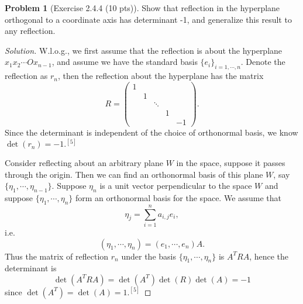 \documentclass{article}
\theoremstyle{definition}
\newtheorem{problem}{Problem}
\theoremstyle{plain}
\begin{document}
\begin{problem}[Exercise 2.4.4 (10 pts)]Show that reflection in the hyperplane orthogonal to a coordinate axis has determinant -1, and generalize this result to any reflection.
\end{problem}
\begin{adjustwidth}{0.7cm}{}
\color{blue}
\begin{proof}[Solution]W.l.o.g., we first assume that the reflection is about the hyperplane $x_1x_2\cdots Ox_{n-1}$, and assume we have the standard basis $\{e_i\}_{i=1,\cdots,n}$. Denote the reflection as $r_n$, then the reflection about the hyperplane has the matrix
\begin{displaymath}
R=\begin{pmatrix}
1&&&&\\
&1&&&\\
&&\ddots&&\\
&&&1&\\
&&&&-1
\end{pmatrix}.
\end{displaymath}
Since the determinant is independent of the choice of orthonormal basis, we know $\det(r_n)=-1.^{[5]}$\par
Consider reflecting about an arbitrary plane $W$ in the space, suppose it passes through the origin. Then we can find an orthonormal basis of this plane $W$, say $\{\eta_1,\cdots,\eta_{n-1}\}$. Suppose $\eta_n$ is a unit vector perpendicular to the space $W$ and suppose $\{\eta_1,\cdots,\eta_n\}$ form an orthonormal basis for the space. We assume that
\begin{displaymath}
\eta_j=\sum_{i=1}^{n}a_{i,j}e_i,
\end{displaymath}
i.e.
\begin{displaymath}
(\eta_1,\cdots,\eta_n)=(e_1,\cdots,e_n)A.
\end{displaymath}
Thus the matrix of reflection $r_n$ under the basis $\{\eta_1,\cdots,\eta_n\}$ is $A^TRA$, hence the determinant is
\begin{displaymath}
\det(A^TRA)=\det(A^T)\det(R)\det(A)=-1
\end{displaymath}
since $\det(A^T)=\det(A)=1.^{[5]}$
\color{black}
\end{proof}
\end{adjustwidth}
\end{document}
